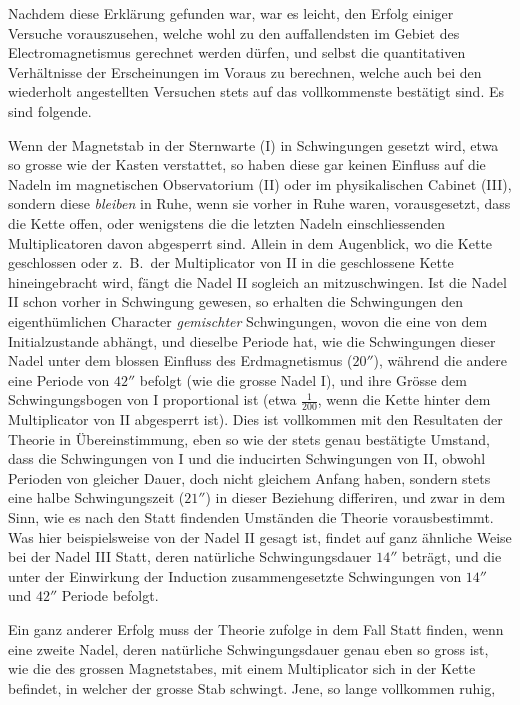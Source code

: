 Nachdem diese Erklärung gefunden war, war es leicht, den Erfolg einiger Versuche vorauszusehen, welche wohl zu den auffallendsten im Gebiet des Electromagnetismus gerechnet werden dürfen, und selbst die quantitativen Verhältnisse der Erscheinungen im Voraus zu berechnen, welche auch bei den wiederholt angestellten Versuchen stets auf das vollkommenste bestätigt sind. Es sind folgende.

Wenn der Magnetstab in der Sternwarte (I) in Schwingungen gesetzt wird, etwa so grosse wie der Kasten verstattet, so haben diese gar keinen Einfluss auf die Nadeln im magnetischen Observatorium (II) oder im physikalischen Cabinet (III), sondern diese \textit{bleiben} in Ruhe, wenn sie vorher in Ruhe waren, vorausgesetzt, dass die Kette offen, oder wenigstens die die letzten Nadeln einschliessenden Multiplicatoren davon abgesperrt sind. Allein in dem Augenblick, wo die Kette geschlossen oder z.\ B.\ der Multiplicator von II in die geschlossene Kette hineingebracht wird, fängt die Nadel II sogleich an mitzuschwingen. Ist die Nadel II schon vorher in Schwingung gewesen, so erhalten die Schwingungen den eigenthümlichen Character \textit{gemischter} Schwingungen, wovon die eine von dem Initialzustande abhängt, und dieselbe Periode hat, wie die Schwingungen dieser Nadel unter dem blossen Einfluss des Erdmagnetismus ($20''$), während die andere eine Periode von $42''$ befolgt (wie die grosse Nadel I), und ihre Grösse dem Schwingungsbogen von I proportional ist (etwa $\frac{1}{200}$, wenn die Kette hinter dem Multiplicator von II abgesperrt ist). Dies ist vollkommen mit den Resultaten der Theorie in Übereinstimmung, eben so wie der stets genau bestätigte Umstand, dass die Schwingungen von I und die inducirten Schwingungen von II, obwohl Perioden von gleicher Dauer, doch nicht gleichem Anfang haben, sondern stets eine halbe Schwingungszeit ($21''$) in dieser Beziehung differiren, und zwar in dem Sinn, wie es nach den Statt findenden Umständen die Theorie vorausbestimmt. Was hier beispielsweise von der Nadel II gesagt ist, findet auf ganz ähnliche Weise bei der Nadel III Statt, deren natürliche Schwingungsdauer $14''$ beträgt, und die unter der Einwirkung der Induction zusammengesetzte Schwingungen von $14''$ und $42''$ Periode befolgt.

Ein ganz anderer Erfolg muss der Theorie zufolge in dem Fall Statt finden, wenn eine zweite Nadel, deren natürliche Schwingungsdauer genau eben so gross ist, wie die des grossen Magnetstabes, mit einem Multiplicator sich in der Kette befindet, in welcher der grosse Stab schwingt. Jene, so lange vollkommen ruhig,
